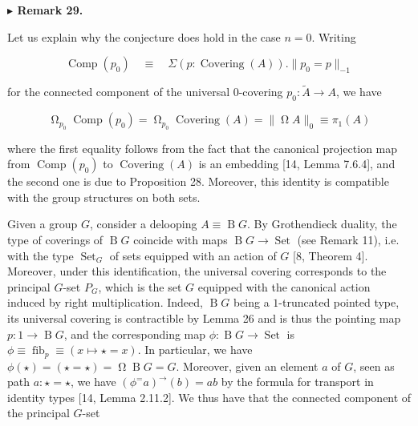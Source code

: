 \documentclass[10pt,a4paper]{article}
\begin{document}
 
 
\par\medskip\noindent\textbf{$\blacktriangleright$ Remark 29.}\par
 
 
Let us explain why the conjecture does hold in the case $n=0$. Writing\par
  
\par  \quad  \[\operatorname{Comp}(p_{0})\quad\equiv\quad\Sigma(p:\operatorname{Covering}(A)).\|p_{0}=p\|_{-1}\]\quad  \quad  
  
for the connected component of the universal 0-covering $p_{0}:\tilde{A}\to A$, we have\par
  
\par  \quad  \[\operatorname{\Omega}_{p_{0}}\operatorname{Comp}(p_{0})=\operatorname{\Omega}_{p_{0}}\operatorname{Covering}(A)=\|\operatorname{\Omega}A\|_{0}\equiv\pi_{1}(A)\]\quad  \quad  
  
where the first equality follows from the fact that the canonical projection map from $\operatorname{Comp}(p_{0})$ to $\operatorname{Covering}(A)$ is an embedding [14, Lemma 7.6.4], and the second one is due to Proposition 28. Moreover, this identity is compatible with the group structures on both sets.\par
 
 
 
Given a group $G$, consider a delooping $A\equiv\operatorname{B}G$. By Grothendieck duality, the type of coverings of $\operatorname{B}G$ coincide with maps $\operatorname{B}G\to\operatorname{Set}$ (see Remark 11), i.e. with the type $\operatorname{Set}_{G}$ of sets equipped with an action of $G$ [8, Theorem 4]. Moreover, under this identification, the universal covering corresponds to the principal $G$-set $P_{G}$, which is the set $G$ equipped with the canonical action induced by right multiplication. Indeed, $\operatorname{B}G$ being a $1$-truncated pointed type, its universal covering is contractible by Lemma 26 and is thus the pointing map $p:1\to\operatorname{B}G$, and the corresponding map $\phi:\operatorname{B}G\to\operatorname{Set}$ is $\phi\equiv\operatorname{fib}_{p}\equiv(x\mapsto\star=x)$. In particular, we have $\phi(\star)=(\star=\star)=\operatorname{\Omega}\operatorname{B}G=G$. Moreover, given an element $a$ of $G$, seen as path $a:\star=\star$, we have $(\phi^{=}a)^{\to}(b)=ab$ by the formula for transport in identity types [14, Lemma 2.11.2]. We thus have that the connected component of the principal $G$-set\par
  
\end{document}
